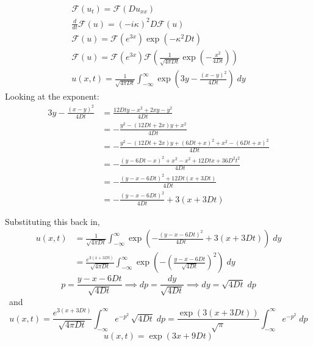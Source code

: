 \documentclass[10pt]{article}
\newcommand{\F}{\mathcal{F}}
\begin{document}
\begin{gather*}
    \F(u_t) = \F(Du_{xx})\\
    \frac{d}{dt}\F(u) = (-i\kappa)^2D\F(u)\\
    \F(u) = \F(e^{3x})\exp(-\kappa^2 Dt)\\
    \F(u) = \F(e^{3x})\F(\frac{1}{\sqrt{4\pi Dt}}\exp(-\frac{x^2}{4Dt}))\\
    u(x, t) = \frac{1}{\sqrt{4\pi Dt}}\int_{-\infty}^{\infty} \exp(3y - \frac{(x-y)^2}{4Dt}) \; dy
\end{gather*}
Looking at the exponent:
\begin{align*}
    3y - \frac{(x-y)^2}{4Dt} &= \frac{12Dty -x^2 + 2xy - y^2}{4Dt}\\
    &= -\frac{y^2 - (12Dt + 2x)y + x^2}{4Dt}\\
    &= -\frac{y^2 - (12Dt  +2x)y + (6Dt + x)^2 + x^2 - (6Dt + x)^2}{4Dt}\\
    &= -\frac{(y - 6Dt - x)^2 + x^2 - x^2 + 12Dtx + 36D^2t^2}{4Dt}\\
    &= -\frac{(y - x-6Dt)^2 + 12Dt(x + 3Dt)}{4Dt}\\
    &= -\frac{(y - x - 6Dt)^2}{4Dt} + 3(x + 3Dt)
\end{align*}

Substituting this back in, 
\begin{align*}
    u(x, t) &= \frac{1}{\sqrt{4\pi Dt}} \int_{-\infty}^{\infty} \exp( -\frac{(y - x - 6Dt)^2}{4Dt} + 3(x + 3Dt))\; dy\\
    &= \frac{e^{3(x + 3Dt)}}{\sqrt{4\pi Dt}} \int_{-\infty}^{\infty} \exp(-\left(\frac{y - x - 6Dt}{\sqrt{4Dt}}\right)^2)\; dy
\end{align*}
\[p = \frac{y - x - 6Dt}{\sqrt{4Dt}} \implies dp = \frac{dy}{\sqrt{4Dt}} \implies dy = \sqrt{4Dt}\; dp \]\
and 
\[u(x, t) = \frac{e^{3(x + 3Dt)}}{\sqrt{4\pi Dt}} \int_{-\infty}^{\infty} e^{-p^2}\, \sqrt{4Dt}\; dp = \frac{\exp(3(x + 3Dt))}{\sqrt{\pi}} \int_{-\infty}^{\infty} e^{-p^2}\; dp\]
\[u(x, t) = \exp(3x + 9Dt)\]
\end{document}
